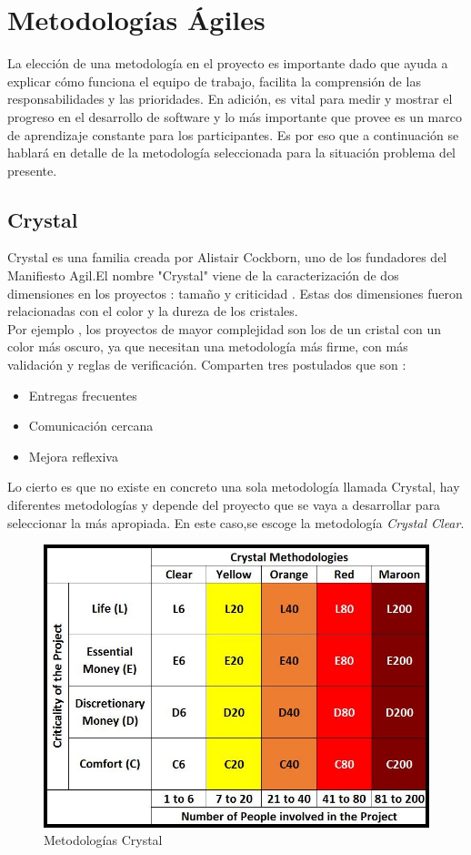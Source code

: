 \section{Metodologías Ágiles}
La elección de una metodología en el proyecto es importante dado que ayuda a explicar cómo funciona el equipo de trabajo, facilita la comprensión de las responsabilidades y las prioridades. En adición, es vital para medir y mostrar el progreso en el desarrollo de software y lo más importante que provee es un marco de aprendizaje constante para los participantes.
Es por eso que a continuación se hablará en detalle de la metodología seleccionada para la situación problema del presente.\\
\subsection{Crystal }
Crystal es una familia creada por Alistair Cockborn, uno de los fundadores del Manifiesto Agil.El nombre "Crystal" viene de la caracterización de dos dimensiones en los proyectos : tamaño y criticidad \cite{cockburn2004crystal} . Estas dos dimensiones fueron relacionadas con el color y la dureza de los cristales. \\ Por ejemplo , los proyectos de mayor complejidad son los de un cristal con un color más oscuro, ya que necesitan una metodología más firme, con más validación y reglas de verificación.
Comparten tres postulados que son :
\begin{itemize}
	\item Entregas frecuentes
	\item Comunicación cercana
	\item Mejora reflexiva
\end{itemize}

Lo cierto es que no existe en concreto una sola metodología llamada Crystal, hay diferentes metodologías y depende del proyecto que se vaya a desarrollar para seleccionar la más apropiada. En este caso,se escoge la metodología \emph{Crystal Clear}.\\

\begin{figure}[h!]
	\centering
	\includegraphics[width=0.7\linewidth]{proyecto/imgs/crystalM}
	\caption{Metodologías Crystal}
	\label{fig:crystalm}
\end{figure}


